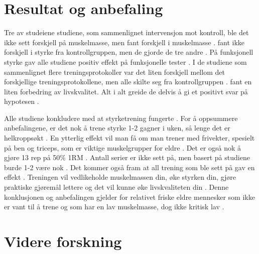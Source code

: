\documentclass[
]{book}
\begin{document}
\hypertarget{resultat-og-anbefaling}{%
\section{Resultat og anbefaling}\label{resultat-og-anbefaling}}

Tre av studeiene studiene, som sammenlignet intervensjon mot kontroll, ble det ikke sett forskjell på muskelmasse, men \citet{vikberg2019} fant forskjell i muskelmasse \citep{schott2019, turpela2017, vincent2002}. \citet{vikberg2019} fant ikke forskjell i styrke fra kontrollgruppen, men de gjorde de tre andre \citep{schott2019, turpela2017, vincent2002}. På funksjonell styrke gav alle studiene positiv effekt på funksjonelle tester \citep{geirsdottir2012, schott2019, turpela2017, vikberg2019, vincent2002}. I de studiene som sammenlignet flere treningsprotokoller var det liten forskjell mellom det forskjellige treningsprotokollene, men alle skilte seg fra kontrollgruppen \citep{schott2019, turpela2017, vikberg2019, vincent2002}. \citet{geirsdottir2012} fant en liten forbedring av livskvalitet. Alt i alt greide de delvis å gi et positivt svar på hypotesen \citep{geirsdottir2012, schott2019, turpela2017, vikberg2019, vincent2002}.

Alle studiene konkludere med at styrketrening fungerte \citep{geirsdottir2012, schott2019, turpela2017, vikberg2019, vincent2002}. For å oppsummere anbefalingene, er det nok å trene styrke 1-2 gagner i uken, så lenge det er helkroppsøkt \citep{turpela2017, vikberg2019}. En ytterlig effekt vil man få om man trener med frivekter, spesielt på ben og triceps, som er viktige muskelgrupper for eldre \citep{schott2019}. Det er også nok å gjøre 13 rep på 50\% 1RM \citep{vincent2002}. Antall serier er ikke sett på, men basert på studiene burde 1-2 være nok \citep{geirsdottir2012, schott2019, turpela2017}. Det kommer også fram at all trening som ble sett på gav en effekt \citep{geirsdottir2012, schott2019, turpela2017, vikberg2019, vincent2002}. Treningen vil vedlikeholde muskelmassen din, øke styrken din, gjøre praktiske gjøremål lettere og det vil kunne øke livskvaliteten din \citep{geirsdottir2012, schott2019, turpela2017, vikberg2019, vincent2002}. Denne konklusjonen og anbefalingen gjelder for relativet friske eldre mennesker som ikke er vant til å trene og som har en lav muskelmasse, dog ikke kritisk lav \citep{geirsdottir2012, schott2019, turpela2017, vikberg2019, vincent2002}.

\hypertarget{videre-forskning}{%
\section{Videre forskning}\label{videre-forskning}}
\end{document}

